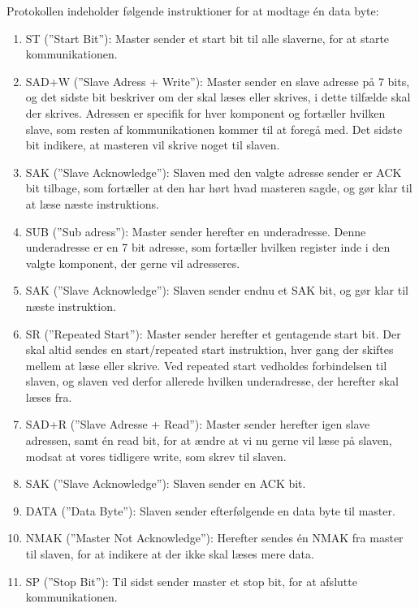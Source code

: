 Protokollen indeholder følgende instruktioner for at modtage én data byte:

\begin{enumerate}
\item ST (”Start Bit”): Master sender et start bit til alle slaverne, for at starte kommunikationen.
\item SAD+W (”Slave Adress + Write”): Master sender en slave adresse på 7 bits, og det sidste bit beskriver om der skal læses eller skrives, i dette tilfælde skal der skrives. Adressen er specifik for hver komponent og fortæller hvilken slave, som resten af kommunikationen kommer til at foregå med. Det sidste bit indikere, at masteren vil skrive noget til slaven.
\item SAK (”Slave Acknowledge”): Slaven med den valgte adresse sender er ACK bit tilbage, som fortæller at den har hørt hvad masteren sagde, og gør klar til at læse næste instruktions.
\item SUB (”Sub adress”): Master sender herefter en underadresse. Denne underadresse er en 7 bit adresse, som fortæller hvilken register inde i den valgte komponent, der gerne vil adresseres.
\item SAK (”Slave Acknowledge”): Slaven sender endnu et SAK bit, og gør klar til næste instruktion.
\item SR (”Repeated Start”): Master sender herefter et gentagende start bit. Der skal altid sendes en start/repeated start instruktion, hver gang der skiftes mellem at læse eller skrive. Ved repeated start vedholdes forbindelsen til slaven, og slaven ved derfor allerede hvilken underadresse, der herefter skal læses fra.
\item SAD+R (”Slave Adresse + Read”): Master sender herefter igen slave adressen, samt én read bit, for at ændre at vi nu gerne vil læse på slaven, modsat at vores tidligere write, som skrev til slaven.
\item SAK (”Slave Acknowledge”):  Slaven sender en ACK bit.
\item DATA (”Data Byte”): Slaven sender efterfølgende en data byte til master.
\item NMAK (”Master Not Acknowledge”): Herefter sendes én NMAK fra master til slaven, for at indikere at der ikke skal læses mere data.
\item SP (”Stop Bit”): Til sidst sender master et stop bit, for at afslutte kommunikationen.
\end{enumerate}
